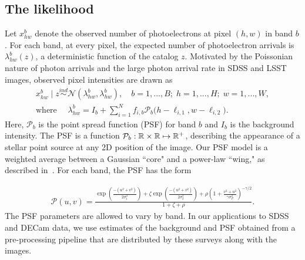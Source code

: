 \subsection{The likelihood}
Let $x_{hw}^b$ denote the observed number of photoelectrons at pixel $(h,w)$ in band $b$.
For each band, at every pixel, the expected number of photoelectron arrivals is $\lambda^b_{hw}(z)$, a deterministic function of the catalog $z$. Motivated by the Poissonian nature of photon arrivals and
the large photon arrival rate in SDSS and LSST images,
observed pixel intensities are drawn as
\begin{align}
  x_{hw}^b \mid z \overset{ind}{\sim} \mathcal{N}(\lambda^b_{hw}, \lambda^b_{hw}),
  \quad
  b = 1, ..., B; \;
  h = 1,..., H; \;
  w = 1, ..., W, \\
 \text{where } \quad
 \lambda^b_{hw} = I_b + \sum_{i = 1}^N f_{i,b} \mathcal{P}_b\big(h - \ell_{i, 1}, w - \ell_{i, 2}\big).
  \label{eq:expected_intensity}
\end{align}
Here, $\mathcal{P}_b$ is the point spread function (PSF) for band $b$ and $I_b$ is the background intensity.
The PSF is a function
$\mathcal{P}_b : \mathbb{R} \times \mathbb{R} \mapsto \mathbb{R}^+$,
describing the appearance of a stellar point source at any 2D position of the image.
Our PSF model is a weighted average between a Gaussian ``core" and a power-law ``wing," as described in~\cite{Xin2018psf}. For each band, the PSF has the form

\begin{align}
    \mathcal{P}(u,v) =
    \frac{\exp(\frac{-(u^2 + v^2)}{2\sigma_1^2}) +
    \zeta \exp(\frac{-(u^2 + v^2)}{2\sigma_2^2}) +
    \rho(1 + \frac{v^2 + u^2}{\gamma\sigma^2_P})^{-\gamma/2} }{1 + \zeta + \rho}.
\end{align}
The PSF parameters are allowed to vary by band.
In our applications to SDSS and DECam data, we use estimates of the background
and PSF obtained from a pre-processing pipeline that are distributed by these surveys along with the images.


